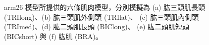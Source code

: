 \begin{figure}[!ht]
    \caption[arm26 模型之肌肉介紹]{arm26 模型所提供的六條肌肉模型，分別模擬為
                                  (a) 肱三頭肌長頭 (TRIlong)、(b) 肱三頭肌外側頭 (TRIlat)、 
                                  (c) 肱三頭肌內側頭 (TRImed)、(d) 肱二頭肌長頭 (BIClong)、
                                  (e) 肱二頭肌短頭 (BICshort) 與 (f) 肱肌 (BRA)。}
    \label{ch4_fig_arm26Muscles}
\end{figure}

\clearpage

